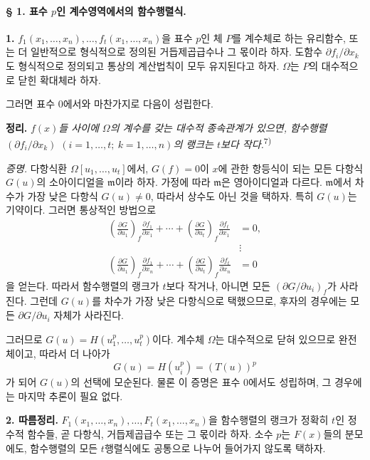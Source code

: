 \bigskip
\paragraph{§ 1. 표수 \(p\)인 계수영역에서의 함수행렬식.}

\textbf{1.}
\(f_1(x_1,\ldots,x_n),\ldots,f_t(x_1,\ldots,x_n)\)을 표수 \(p\)인 체 \(P\)를 계수체로 하는 유리함수, 또는 더 일반적으로 형식적으로 정의된 거듭제곱급수나 그 몫이라 하자. 도함수 \(\partial f_i/\partial x_k\)도 형식적으로 정의되고 통상의 계산법칙이 모두 유지된다고 하자. \(\Omega\)는 \(P\)의 대수적으로 닫힌 확대체라 하자.

그러면 표수 0에서와 마찬가지로 다음이 성립한다.

\textbf{정리.}
\emph{\(f(x)\)들 사이에 \(\Omega\)의 계수를 갖는 대수적 종속관계가 있으면, 함수행렬 \((\partial f_i/\partial x_k)\) \((i=1,\ldots,t;\ k=1,\ldots,n)\)의 랭크는 \(t\)보다 작다.}\textsuperscript{7)}

\emph{증명.}
다항식환 \(\Omega[u_1,\ldots,u_t]\)에서, \(G(f)=0\)이 \(x\)에 관한 항등식이 되는 모든 다항식 \(G(u)\)의 소아이디얼을 \(\mathfrak m\)이라 하자. 가정에 따라 \(\mathfrak m\)은 영아이디얼과 다르다. \(\mathfrak m\)에서 차수가 가장 낮은 다항식 \(G(u)\ne0\), 따라서 상수도 아닌 것을 택하자. 특히 \(G(u)\)는 기약이다. 그러면 통상적인 방법으로
\[
\begin{aligned}
\left(\frac{\partial G}{\partial u_1}\right)_{f}\frac{\partial f_1}{\partial x_1}
 +\cdots+
\left(\frac{\partial G}{\partial u_t}\right)_{f}\frac{\partial f_t}{\partial x_1}&=0,\\[-1mm]
&\vdots\\[-1mm]
\left(\frac{\partial G}{\partial u_1}\right)_{f}\frac{\partial f_1}{\partial x_n}
 +\cdots+
\left(\frac{\partial G}{\partial u_t}\right)_{f}\frac{\partial f_t}{\partial x_n}&=0
\end{aligned}
\]
을 얻는다. 따라서 함수행렬의 랭크가 \(t\)보다 작거나, 아니면 모든 \(\left(\partial G/\partial u_i\right)_f\)가 사라진다. 그런데 \(G(u)\)를 차수가 가장 낮은 다항식으로 택했으므로, 후자의 경우에는 모든 \(\partial G/\partial u_i\) 자체가 사라진다.

그러므로 \(G(u)=H(u_1^p,\ldots,u_t^p)\)이다. 계수체 \(\Omega\)는 대수적으로 닫혀 있으므로 완전체이고, 따라서 더 나아가
\[
G(u)=H(u_i^p)=(T(u))^p
\]
가 되어 \(G(u)\)의 선택에 모순된다. 물론 이 증명은 표수 0에서도 성립하며, 그 경우에는 마지막 추론이 필요 없다.

\textbf{2. 따름정리.}
\(F_1(x_1,\ldots,x_n),\ldots,F_t(x_1,\ldots,x_n)\)을 함수행렬의 랭크가 정확히 \(t\)인 정수적 함수들, 곧 다항식, 거듭제곱급수 또는 그 몫이라 하자. 소수 \(p\)는 \(F(x)\)들의 분모에도, 함수행렬의 모든 \(t\)행렬식에도 공통으로 나누어 들어가지 않도록 택하자.


